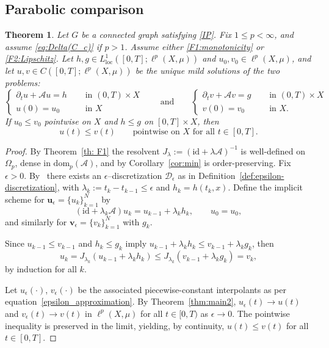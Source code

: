 \documentclass[journal]{article}
\newtheorem{theorem}{Theorem}[section]
\theoremstyle{nonitalic}
\theoremstyle{nonitalic}
\theoremstyle{plain} %
\numberwithin{equation}{section}
\begin{document}
\subsection{Parabolic comparison}

\begin{theorem}\label{thm:parabolic-comparison-infinite}
Let $G$ be a connected graph satisfying  \textnormal{\ref{IP}}. Fix $1\le p<\infty$, and assume \eqref{eq:Delta(C_c)} if $p>1$. Assume either \textnormal{\ref{F1:monotonicity}}   or \textnormal{\ref{F2:Lipschitz}}. Let $h,g\in L^1_{\mathrm{loc}}([0,T];\ell^p(X,\mu))$ and $u_0,v_0\in\ell^p(X,\mu)$, and let $u,v\in C([0,T];\ell^p(X,\mu))$ be the unique mild solutions of the two problems:
\[
\begin{cases}
    \partial_t u + \mathcal{A} u = h &\quad  \text{ in } (0,T)\times X\\
    u(0)=u_0 &\quad  \text{ in }  X
\end{cases}
\qquad \text{and} \qquad
\begin{cases}
    \partial_t v + \mathcal{A} v = g & \quad  \text{ in } (0,T)\times X\\
    v(0)=v_0 & \quad  \text{ in }  X.
\end{cases}
\]
If $u_0\le v_0$ pointwise on $X$ and $h\leq g$  on $[0,T]\times X$, then
\[
u(t)\leq v(t) \qquad \text{pointwise on $X$ for all $t\in [0, T]$.}
\]

\end{theorem}

\begin{proof}
By Theorem~\ref{th: F1}   the resolvent $J_\lambda:=(\mathrm{id}+\lambda \mathcal{A})^{-1}$  is well-defined on $\Omega_p$, dense in $\mathrm{dom}_p(\mathcal{A})$, and by  Corollary~\ref{cor:min} is order-preserving. Fix $\epsilon>0$. By~\cite[Lemma 4.1]{evans1977nonlinear} there exists an $\epsilon$–discretization $\mathcal{D}_\epsilon$ as in Definition~\ref{def:epsilon-discretization}, with $\lambda_k:=t_k-t_{k-1}\le\epsilon$ and $h_k= h(t_k, x)$. Define the implicit scheme for $\boldsymbol{u}_\epsilon=\{u_k\}_{k=1}^N$ by
\[
(\mathrm{id}+\lambda_k \mathcal{A})u_k = u_{k-1}+ \lambda_k h_k,\qquad u_0=u_0,
\]
and similarly for $\boldsymbol{v}_\epsilon=\{v_k\}_{k=1}^N$ with $g_k$. 

Since $u_{k-1}\le v_{k-1}$ and $h_k\leq g_k$ imply
$u_{k-1}+\lambda_k h_k\leq v_{k-1}+\lambda_k g_k$, then
\[
u_k = J_{\lambda_k}(u_{k-1}+\lambda_k h_k)  \leq J_{\lambda_k}(v_{k-1}+\lambda_k g_k)=v_k,
\]
by induction for all $k$.

Let $u_\epsilon(\cdot)$, $v_\epsilon(\cdot)$ be the associated piecewise-constant interpolants as per equation~\eqref{epsilon_approximation}. By Theorem~\ref{thm:main2}, $u_\epsilon(t)\to u(t)$ and $v_\epsilon(t)\to v(t)$  in $\ell^p(X,\mu)$ for all $t\in [0,T)$ as $\epsilon\to 0$. The pointwise inequality is preserved in the limit, yielding, by continuity, $u(t)\le v(t)$ for all $t\in[0,T]$. 
\end{proof}
\end{document}
